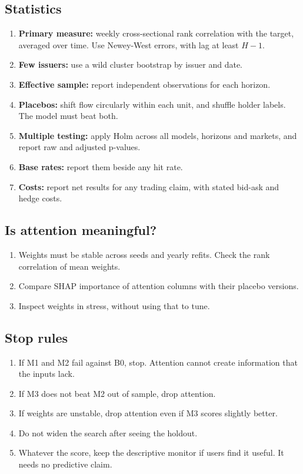 \documentclass[11pt]{article}
\begin{document}
\subsection{Statistics}
\begin{enumerate}
\item \textbf{Primary measure:} weekly cross-sectional rank correlation with the target, averaged over time. Use Newey-West errors, with lag at least $H-1$.
\item \textbf{Few issuers:} use a wild cluster bootstrap by issuer and date.
\item \textbf{Effective sample:} report independent observations for each horizon.
\item \textbf{Placebos:} shift flow circularly within each unit, and shuffle holder labels. The model must beat both.
\item \textbf{Multiple testing:} apply Holm across all models, horizons and markets, and report raw and adjusted p-values.
\item \textbf{Base rates:} report them beside any hit rate.
\item \textbf{Costs:} report net results for any trading claim, with stated bid-ask and hedge costs.
\end{enumerate}

\subsection{Is attention meaningful?}
\begin{enumerate}
\item Weights must be stable across seeds and yearly refits. Check the rank correlation of mean weights.
\item Compare SHAP importance of attention columns with their placebo versions.
\item Inspect weights in stress, without using that to tune.
\end{enumerate}

\subsection{Stop rules}
\begin{enumerate}
\item If M1 and M2 fail against B0, stop. Attention cannot create information that the inputs lack.
\item If M3 does not beat M2 out of sample, drop attention.
\item If weights are unstable, drop attention even if M3 scores slightly better.
\item Do not widen the search after seeing the holdout.
\item Whatever the score, keep the descriptive monitor if users find it useful. It needs no predictive claim.
\end{enumerate}
\end{document}
